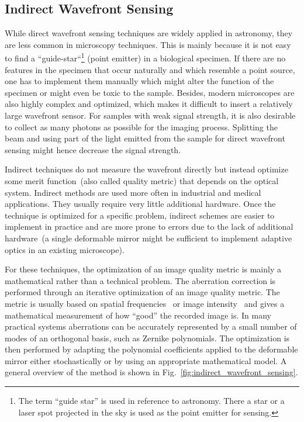 \subsection{Indirect Wavefront Sensing}
\label{sec:IndirectWavefrontSensing}

While direct wavefront sensing techniques are widely applied in astronomy, they are less common in microscopy techniques. This is mainly because it is not easy to find a ``guide-star``\footnote{The term ``guide star'' is used in reference to astronomy. There a star or a laser spot projected in the sky is used as the point emitter for sensing.} (point emitter) in a biological specimen. If there are no features in the specimen that occur naturally and which resemble a point source, one has to implement them manually which might alter the function of the specimen or might even be toxic to the sample. Besides, modern microscopes are also highly complex and optimized, which makes it difficult to insert a relatively large wavefront sensor. For samples with weak signal strength, it is also desirable to collect as many photons as possible for the imaging process. Splitting the beam and using part of the light emitted from the sample for direct wavefront sensing might hence decrease the signal strength.

Indirect techniques do not measure the wavefront directly but instead optimize some merit function~(also called quality metric) that depends on the optical system. Indirect methods are used more often in industrial and medical applications. They usually require very little additional hardware. Once the technique is optimized for a specific problem, indirect schemes are easier to implement in practice and are more prone to errors due to the lack of additional hardware~(a single deformable mirror might be sufficient to implement adaptive optics in an existing microscope). 

For these techniques, the optimization of an image quality metric is mainly a mathematical rather than a technical problem. The aberration correction is performed through an iterative optimization of an image quality metric. The metric is usually based on spatial frequencies~\cite{wide_AOM_loew_freq} or image intensity~\cite{indirect_metric_intensity} and gives a mathematical measurement of how ``good'' the recorded image is. In many practical systems aberrations can be accurately represented by a small number of modes of an orthogonal basis, such as Zernike polynomials. The optimization is then performed by adapting the polynomial coefficients applied to the deformable mirror either stochastically or by using an appropriate mathematical model. A general overview of the method is shown in Fig.~\ref{fig:indirect_wavefront_sensing}.

